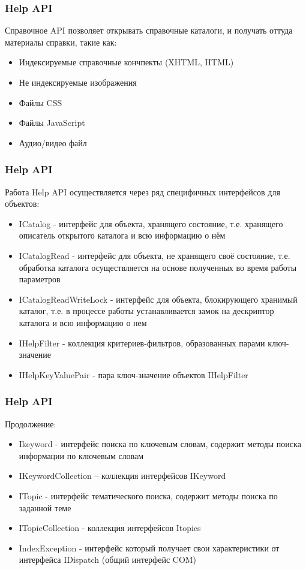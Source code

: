 \documentclass{beamer}
\begin{document}
\begin{frame}
\frametitle{Help API}

Справочное API позволяет открывать справочные каталоги, и получать оттуда материалы справки, такие как:
\begin{itemize}
\item Индексируемые справочные кончпекты (XHTML, HTML)
\item Не индексируемые изображения
\item Файлы CSS
\item Файлы JavaScript
\item Аудио/видео файл
\end{itemize}

\end{frame}


\begin{frame}
\frametitle{Help API}

Работа Help API осуществляется через ряд специфичных интерфейсов для объектов:
\begin{itemize}
\item ICatalog - интерфейс для объекта, хранящего состояние, т.е. хранящего описатель открытого каталога и всю информацию о нём
\item ICatalogRead - интерфейс для объекта, не хранящего своё состояние, т.е. обработка каталога осуществляется на основе полученных во время работы параметров
\item ICatalogReadWriteLock - интерфейс для объекта, блокирующего хранимый каталог, т.е. в процессе работы устанавливается замок на дескриптор каталога и всю информацию о нем
\item IHelpFilter -  коллекция критериев-фильтров, образованных парами ключ-значение
\item IHelpKeyValuePair - пара ключ-значение объектов IHelpFilter 
\end{itemize}

\end{frame}


\begin{frame}
\frametitle{Help API}

Продолжение:
\begin{itemize}
\item Ikeyword - интерфейс поиска по ключевым словам, содержит методы поиска информации по ключевым словам
\item IKeywordCollection – коллекция интерфейсов IKeyword 
\item ITopic - интерфейс тематического поиска, содержит методы поиска по заданной теме
\item ITopicCollection - коллекция интерфейсов Itopics
\item IndexException - интерфейс который получает свои характеристики от интерфейса IDispatch (общий интерфейс COM)
\end{itemize}

\end{frame}
\end{document}
